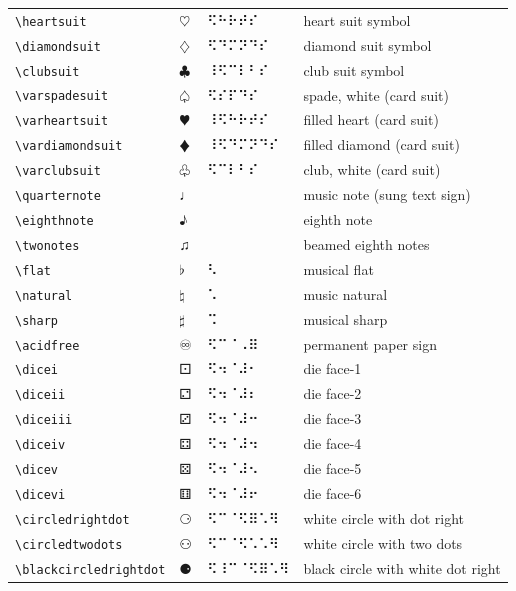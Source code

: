 \documentclass[oneside]{article}
\begin{document}
\begin{longtable}{llll}
\verb|\heartsuit| & $\heartsuit$ &  ⠫⠓⠗⠞⠎  & {heart suit symbol} \\[2ex]
\verb|\diamondsuit| & $\diamondsuit$ &  ⠫⠙⠍⠝⠙⠎  & {diamond suit symbol} \\[2ex]
\verb|\clubsuit| & $\clubsuit$ &  ⠸⠫⠉⠇⠃⠎  & {club suit symbol} \\[2ex]
\verb|\varspadesuit| & $\varspadesuit$ &  ⠫⠎⠏⠙⠎  & {spade, white (card suit)} \\[2ex]
\verb|\varheartsuit| & $\varheartsuit$ &  ⠸⠫⠓⠗⠞⠎  & {filled heart (card suit)} \\[2ex]
\verb|\vardiamondsuit| & $\vardiamondsuit$ &  ⠸⠫⠙⠍⠝⠙⠎  & {filled diamond (card suit)} \\[2ex]
\verb|\varclubsuit| & $\varclubsuit$ &  ⠫⠉⠇⠃⠎  & {club, white (card suit)} \\[2ex]
\verb|\quarternote| & $\quarternote$ &    & {music note (sung text sign)} \\[2ex]
\verb|\eighthnote| & $\eighthnote$ &    & {eighth note} \\[2ex]
\verb|\twonotes| & $\twonotes$ &    & {beamed eighth notes} \\[2ex]
\verb|\flat| & $\flat$ &  ⠣  & {musical flat} \\[2ex]
\verb|\natural| & $\natural$ &  ⠡  & {music natural} \\[2ex]
\verb|\sharp| & $\sharp$ &  ⠩  & {musical sharp} \\[2ex]
\verb|\acidfree| & $\acidfree$ &  ⠫⠉⠈⠠⠿  & {permanent paper sign} \\[2ex]
\verb|\dicei| & $\dicei$ &  ⠫⠲⠈⠼⠂  & {die face-1} \\[2ex]
\verb|\diceii| & $\diceii$ &  ⠫⠲⠈⠼⠆  & {die face-2} \\[2ex]
\verb|\diceiii| & $\diceiii$ &  ⠫⠲⠈⠼⠒  & {die face-3} \\[2ex]
\verb|\diceiv| & $\diceiv$ &  ⠫⠲⠈⠼⠲  & {die face-4} \\[2ex]
\verb|\dicev| & $\dicev$ &  ⠫⠲⠈⠼⠢  & {die face-5} \\[2ex]
\verb|\dicevi| & $\dicevi$ &  ⠫⠲⠈⠼⠖  & {die face-6} \\[2ex]
\verb|\circledrightdot| & $\circledrightdot$ &  ⠫⠉⠈⠫⠿⠡⠻  & {white circle with dot right} \\[2ex]
\verb|\circledtwodots| & $\circledtwodots$ &  ⠫⠉⠈⠫⠡⠡⠻  & {white circle with two dots} \\[2ex]
\verb|\blackcircledrightdot| & $\blackcircledrightdot$ &  ⠫⠸⠉⠈⠫⠿⠡⠻  & {black circle with white dot right} \\[2ex]

\end{longtable}
\end{document}
